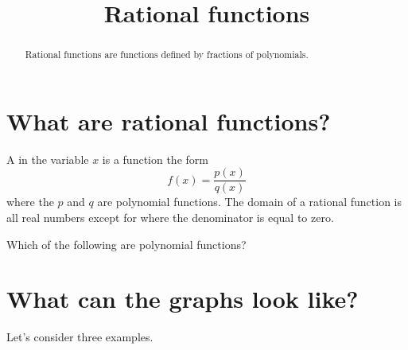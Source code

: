 \documentclass{ximera}
\title[Dig-In:]{Rational functions}
\begin{document}
\begin{abstract}
  Rational functions are functions defined by fractions of
  polynomials.
\end{abstract}
\maketitle




\section{What are rational functions?}

\begin{definition}
  A  in the variable $x$ is a function the form
  \[
  f(x) = \frac{p(x)}{q(x)}
  \]
  where the $p$ and $q$ are polynomial functions. The domain of a
  rational function is all real numbers except for where the
  denominator is equal to zero.
\end{definition}

\begin{question}
  Which of the following are polynomial functions?
  \begin{multipleChoice}
  \end{multipleChoice}
\end{question}



\section{What can the graphs look like?}


Let's consider three examples. 


\begin{image}
\end{image}
\end{document}
